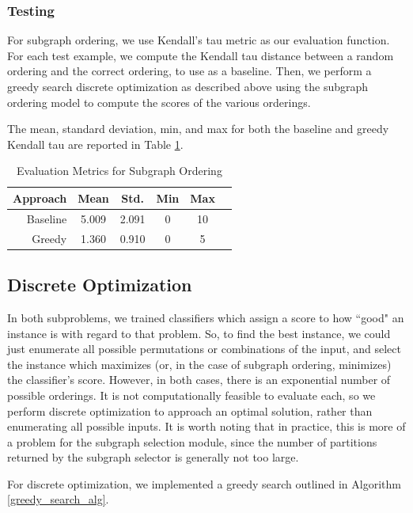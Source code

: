 \documentclass[12pt]{article}
\begin{document}
\subsubsection{Testing}

For subgraph ordering, we use Kendall's tau metric as our evaluation function.
For each test example, we compute the Kendall tau distance between a random
ordering and the correct ordering, to use as a baseline. Then, we perform a
greedy search discrete optimization as described above using the subgraph
ordering model to compute the scores of the various orderings.

The mean, standard deviation, min, and max for both the baseline and greedy
Kendall tau are reported in Table \ref{tab:order_eval}.

\begin{table}
\centering
\begin{tabular}{|r|c|c|c|c|c|}
\hline
Approach & Mean  & Std.  & Min & Max \\ \hline\hline
Baseline & 5.009 & 2.091 & 0   & 10  \\ \hline
Greedy   & 1.360 & 0.910 & 0   & 5   \\ \hline
\end{tabular}
\label{tab:order_eval}
\caption{Evaluation Metrics for Subgraph Ordering}
\end{table}


\subsection{Discrete Optimization}

In both subproblems, we trained classifiers which assign a score to how ``good"
an instance is with regard to that problem. So, to find the best instance, we
could just enumerate all possible permutations or combinations of the input,
and select the instance which maximizes (or, in the case of subgraph ordering,
minimizes) the classifier's score. However, in both cases, there is an exponential number of possible orderings.
It is not computationally feasible to evaluate each, so we
perform discrete optimization to approach an optimal solution, rather than
enumerating all possible inputs. It is worth noting that in practice, this is
more of a problem for the subgraph selection module, since the number of partitions
returned by the subgraph selector is generally not too large.

For discrete optimization, we implemented a greedy search outlined in Algorithm \ref{greedy_search_alg}.
\end{document}
